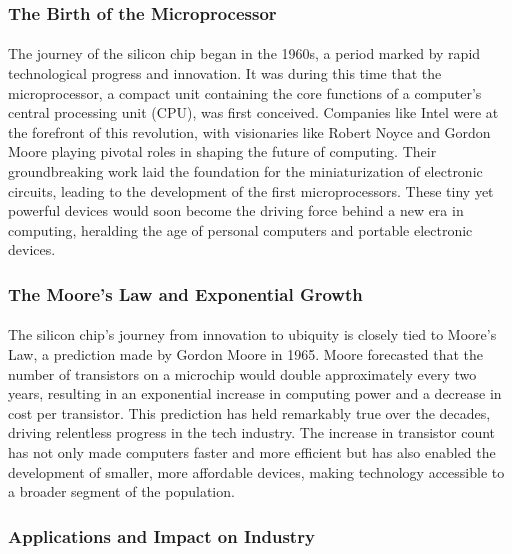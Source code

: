 \documentclass[a4paper,12pt]{book}
\begin{document}
\subsubsection*{The Birth of the Microprocessor}
\paragraph{}
The journey of the silicon chip began in the 1960s, a period marked by rapid technological progress and innovation. It was during this time that the microprocessor, a compact unit containing the core functions of a computer's central processing unit (CPU), was first conceived. Companies like Intel were at the forefront of this revolution, with visionaries like Robert Noyce and Gordon Moore playing pivotal roles in shaping the future of computing. Their groundbreaking work laid the foundation for the miniaturization of electronic circuits, leading to the development of the first microprocessors. These tiny yet powerful devices would soon become the driving force behind a new era in computing, heralding the age of personal computers and portable electronic devices.

\subsubsection*{The Moore's Law and Exponential Growth}
\paragraph{}
The silicon chip's journey from innovation to ubiquity is closely tied to Moore's Law, a prediction made by Gordon Moore in 1965. Moore forecasted that the number of transistors on a microchip would double approximately every two years, resulting in an exponential increase in computing power and a decrease in cost per transistor. This prediction has held remarkably true over the decades, driving relentless progress in the tech industry. The increase in transistor count has not only made computers faster and more efficient but has also enabled the development of smaller, more affordable devices, making technology accessible to a broader segment of the population.

\subsubsection*{Applications and Impact on Industry}
\end{document}
